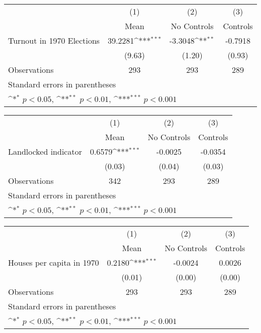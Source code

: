 {
\def\sym#1{\ifmmode^{#1}\else\(^{#1}\)\fi}
\begin{tabular}{l*{3}{c}}
\hline\hline
                    &\multicolumn{1}{c}{(1)}&\multicolumn{1}{c}{(2)}&\multicolumn{1}{c}{(3)}\\
                    &\multicolumn{1}{c}{Mean}&\multicolumn{1}{c}{No Controls}&\multicolumn{1}{c}{Controls}\\
\hline
Turnout in 1970 Elections&     39.2281\sym{***}&     -3.3048\sym{**} &     -0.7918         \\
                    &      (9.63)         &      (1.20)         &      (0.93)         \\
\hline
Observations        &         293         &         293         &         289         \\
\hline\hline
\multicolumn{4}{l}{\footnotesize Standard errors in parentheses}\\
\multicolumn{4}{l}{\footnotesize \sym{*} \(p<0.05\), \sym{**} \(p<0.01\), \sym{***} \(p<0.001\)}\\
\end{tabular}
}
{
\def\sym#1{\ifmmode^{#1}\else\(^{#1}\)\fi}
\begin{tabular}{l*{3}{c}}
\hline\hline
                    &\multicolumn{1}{c}{(1)}&\multicolumn{1}{c}{(2)}&\multicolumn{1}{c}{(3)}\\
                    &\multicolumn{1}{c}{Mean}&\multicolumn{1}{c}{No Controls}&\multicolumn{1}{c}{Controls}\\
\hline
Landlocked indicator&      0.6579\sym{***}&     -0.0025         &     -0.0354         \\
                    &      (0.03)         &      (0.04)         &      (0.03)         \\
\hline
Observations        &         342         &         293         &         289         \\
\hline\hline
\multicolumn{4}{l}{\footnotesize Standard errors in parentheses}\\
\multicolumn{4}{l}{\footnotesize \sym{*} \(p<0.05\), \sym{**} \(p<0.01\), \sym{***} \(p<0.001\)}\\
\end{tabular}
}
{
\def\sym#1{\ifmmode^{#1}\else\(^{#1}\)\fi}
\begin{tabular}{l*{3}{c}}
\hline\hline
                    &\multicolumn{1}{c}{(1)}&\multicolumn{1}{c}{(2)}&\multicolumn{1}{c}{(3)}\\
                    &\multicolumn{1}{c}{Mean}&\multicolumn{1}{c}{No Controls}&\multicolumn{1}{c}{Controls}\\
\hline
Houses per capita in 1970&      0.2180\sym{***}&     -0.0024         &      0.0026         \\
                    &      (0.01)         &      (0.00)         &      (0.00)         \\
\hline
Observations        &         293         &         293         &         289         \\
\hline\hline
\multicolumn{4}{l}{\footnotesize Standard errors in parentheses}\\
\multicolumn{4}{l}{\footnotesize \sym{*} \(p<0.05\), \sym{**} \(p<0.01\), \sym{***} \(p<0.001\)}\\
\end{tabular}
}
